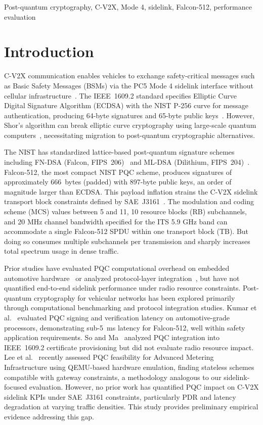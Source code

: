 \documentclass[conference]{IEEEtran}
\begin{document}
\begin{IEEEkeywords}
Post-quantum cryptography, C-V2X, Mode 4, sidelink, Falcon-512, performance evaluation
\end{IEEEkeywords}

\section{Introduction}

C-V2X communication enables vehicles to exchange safety-critical messages such as Basic Safety Messages (BSMs) via the PC5 Mode 4 sidelink interface without cellular infrastructure~\cite{3gpp_36213}. The IEEE~1609.2 standard specifies Elliptic Curve Digital Signature Algorithm (ECDSA) with the NIST P-256 curve for message authentication, producing 64-byte signatures and 65-byte public keys~\cite{ieee_16092}. However, Shor's algorithm can break elliptic curve cryptography using large-scale quantum computers~\cite{shor1994algorithms}, necessitating migration to post-quantum cryptographic alternatives.

The NIST has standardized lattice-based post-quantum signature schemes including FN-DSA (Falcon, FIPS~206)~\cite{fips206} and ML-DSA (Dilithium, FIPS~204)~\cite{fips204}. Falcon-512, the most compact NIST PQC scheme, produces signatures of approximately 666~bytes (padded) with 897-byte public keys, an order of magnitude larger than ECDSA. This payload inflation strains the C-V2X sidelink transport block constraints defined by SAE~J3161~\cite{sae_j3161}. The modulation and coding scheme (MCS) values between 5 and 11, 10 resource blocks (RB) subchannels, and 20 MHz channel bandwidth specified for the ITS 5.9 GHz band can accommodate a single Falcon-512 SPDU within one transport block (TB). But doing so consumes multiple subchannels per transmission and sharply increases total spectrum usage in dense traffic.


Prior studies have evaluated PQC computational overhead on embedded automotive hardware~\cite{kumar2024pqc_automotive} or analyzed protocol-layer integration~\cite{so2018pqc_protocols}, but have not quantified end-to-end sidelink performance under radio resource constraints. Post-quantum cryptography for vehicular networks has been explored primarily through computational benchmarking and protocol integration studies. Kumar et al.~\cite{kumar2024pqc_automotive} evaluated PQC signing and verification latency on automotive-grade processors, demonstrating sub-5~ms latency for Falcon-512, well within safety application requirements. So and Ma~\cite{so2018pqc_protocols} analyzed PQC integration into IEEE~1609.2 certificate provisioning but did not evaluate radio resource impact. Lee et al.~\cite{lee2025pqc_ami} recently assessed PQC feasibility for Advanced Metering Infrastructure using QEMU-based hardware emulation, finding stateless schemes compatible with gateway constraints, a methodology analogous to our sidelink-focused evaluation. However, no prior work has quantified PQC impact on C-V2X sidelink KPIs under SAE~J3161 constraints, particularly PDR and latency degradation at varying traffic densities. This study provides preliminary empirical evidence addressing this gap.
\end{document}
